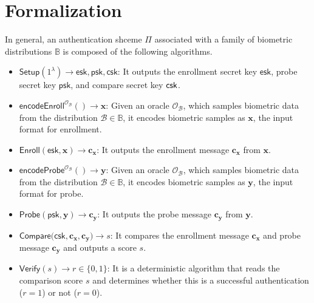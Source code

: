 

\section{Formalization}
\label{sec:formalization}


In general, an authentication shceme $\Pi$ associated with a family of biometric distributions $\mathbb{B}$ is composed of the following algorithms.

\begin{itemize}

	\item $\textsf{Setup}(1^\lambda) \to \textsf{esk}, \textsf{psk}, \textsf{csk}$: It outputs the enrollment secret key $\textsf{esk}$, probe secret key $\textsf{psk}$, and compare secret key $\sf csk$.

	\item $\textsf{encodeEnroll}^{\mathcal{O}_{\mathcal{B}}}() \to \mathbf{x}$: Given an oracle $\mathcal{O}_{\mathcal{B}}$, which samples biometric data from the distribution $\mathcal{B} \in \mathbb{B}$, it encodes biometric samples as $\mathbf{x}$, the input format for enrollment. 

	\item $\textsf{Enroll}(\textsf{esk}, \mathbf{x}) \to \mathbf{c_x}$: It outputs the enrollment message $\mathbf{c_x}$ from $\mathbf{x}$.

	\item $\textsf{encodeProbe}^{\mathcal{O}_{\mathcal{B}}}() \to \mathbf{y}$: Given an oracle $\mathcal{O}_{\mathcal{B}}$, which samples biometric data from the distribution $\mathcal{B} \in \mathbb{B}$, it encodes biometric samples as $\mathbf{y}$, the input format for probe.

	\item $\textsf{Probe}(\textsf{psk}, \mathbf{y}) \to \mathbf{c_y}$: It outputs the probe message $\mathbf{c_y}$ from $\mathbf{y}$.

	\item $\textsf{Compare}(\textsf{csk}, \mathbf{c_x}, \mathbf{c_y)} \to s$: It compares the enrollment message $\mathbf{c_x}$ and probe message $\mathbf{c_y}$ and outputs a score $s$.

	\item $\textsf{Verify}(s) \to r \in \{0,1\}$: It is a deterministic algorithm that reads the comparison score $s$ and determines whether this is a successful authentication ($r = 1$) or not ($r = 0$).

\end{itemize}

